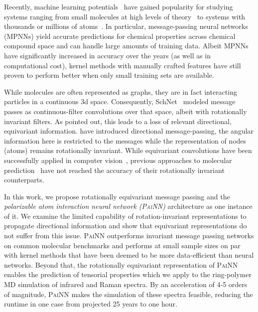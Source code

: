 \documentclass[reprint,
amsmath,amssymb,
 aip,jcp
]{revtex4-2}
\newcommand{\painn}{\textsc{PaiNN}}
\begin{document}
Recently, machine learning potentials~\cite{behler2016perspective,Unke2020mlforce,von2020exploring} have gained popularity for studying systems ranging from small molecules at high levels of theory~\cite{chmiela2018,westermayr2020combining} to systems with thousands or millions of atoms~\cite{morawietz2016van,bartok2018machine,lu202086}.
In particular, message-passing neural networks~\cite{gilmer2017neural} (MPNNs) yield accurate predictions for chemical properties across chemical compound space and can handle large amounts of training data.
Albeit MPNNs have significantly increased in accuracy over the years (as well as in computational cost), kernel methods with manually crafted features \cite{chmiela2017machine,christensen2020fchl,bartok2010gaussian} have still proven to perform better when only small training sets are available.

While molecules are often represented as graphs, they are in fact interacting particles in a continuous 3d space.
Consequently, SchNet~\cite{schutt2017schnet} modeled message passes as continuous-filter convolutions over that space, albeit with rotationally invariant filters.
As \citet{miller2020relevance} pointed out, this leads to a loss of relevant directional, equivariant information.
\citet{klicpera2020directional} have introduced directional message-passing, the angular information here is restricted to the messages while the representation of nodes (atoms) remains rotationally invariant.
While equivariant convolutions have been successfully applied in computer vision~\cite{cohen2016steerable,weiler2018learning,worrall2018cubenet}, previous approaches to molecular prediction~\cite{thomas2018tensor,anderson2019cormorant} have not reached the accuracy of their rotationally invariant counterparts.

In this work, we propose rotationally equivariant message passing and the \emph{polarizable atom interaction neural network (\painn{})} architecture as one instance of it.
We examine the limited capability of rotation-invariant representations to propagate directional information and show that equivariant representations do not suffer from this issue.
\painn{} outperforms invariant message passing networks on common molecular benchmarks and performs at small sample sizes on par with kernel methods that have been deemed to be more data-efficient than neural networks.
Beyond that, the rotationally equivariant representation of \painn{} enables the prediction of tensorial properties which we apply to the ring-polymer MD simulation of infrared and Raman spectra.
By an acceleration of 4-5 orders of magnitude, \painn{} makes the simulation of these spectra feasible, reducing the runtime in one case from projected 25 years to one hour.
\end{document}
